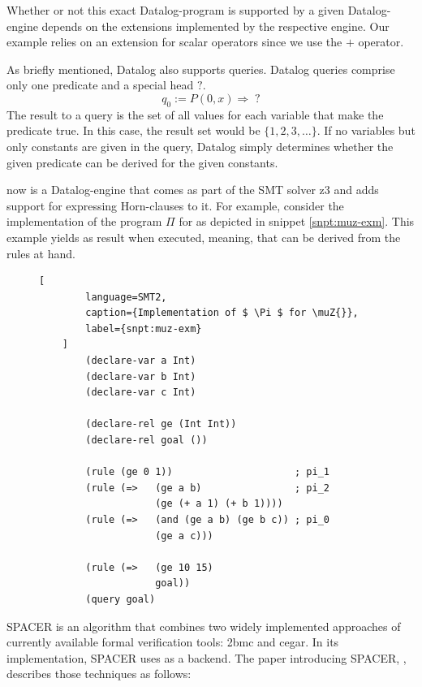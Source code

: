 Whether or not this exact Datalog-program is supported by a given Datalog-engine depends on the extensions implemented by the respective engine.
Our example relies on an extension for scalar operators since we use the $ + $ operator.

As briefly mentioned, Datalog also supports queries.
Datalog queries comprise only one predicate and a special head $ ? $.
\begin{equation*}
    q_0 := P(0, x) \Rightarrow \; ?
\end{equation*}
The result to a query is the set of all values for each variable that make the predicate true.
In this case, the result set would be $ \{ 1, 2, 3, \dots \} $.
If no variables but only constants are given in the query, Datalog simply determines whether the given predicate can be derived for the given constants.

\muZ{} now is a Datalog-engine that comes as part of the SMT solver z3 \cite{Moura08} and adds support for expressing Horn-clauses to it.
For example, consider the implementation of the program $ \Pi $ for \muZ{} as depicted in snippet \ref{snpt:muz-exm}.
This example yields  as result when executed, meaning, that  can be derived from the rules at hand.

\begin{figure}
    \begin{lstlisting}[
        language=SMT2,
        caption={Implementation of $ \Pi $ for \muZ{}},
        label={snpt:muz-exm}
    ]
        (declare-var a Int)
        (declare-var b Int)
        (declare-var c Int)

        (declare-rel ge (Int Int))
        (declare-rel goal ())

        (rule (ge 0 1))                     ; pi_1
        (rule (=>   (ge a b)                ; pi_2
                    (ge (+ a 1) (+ b 1))))
        (rule (=>   (and (ge a b) (ge b c)) ; pi_0
                    (ge a c)))

        (rule (=>   (ge 10 15)
                    goal))
        (query goal)
    \end{lstlisting}
\end{figure}

SPACER \cite{Komuravelli13} is an algorithm that combines two widely implemented approaches of currently available formal verification tools: \gls{2bmc} and \gls{cegar}.
In its implementation, SPACER uses \muZ{} as a backend.
The paper introducing SPACER,  \cite{Komuravelli13}, describes those techniques as follows:

